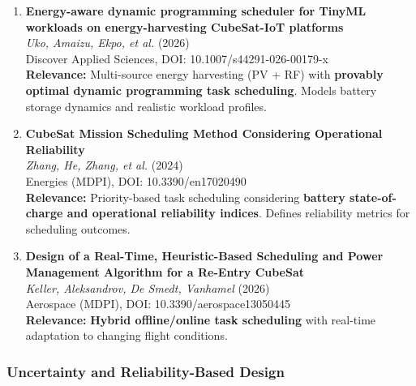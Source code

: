 \documentclass[11pt]{article}
\begin{document}
\begin{enumerate}[label=\textbf{\arabic*.},resume]
    \item \textbf{Energy-aware dynamic programming scheduler for TinyML workloads on energy-harvesting CubeSat-IoT platforms}\\
    \textit{Uko, Amaizu, Ekpo, et al.} (2026)\\
    Discover Applied Sciences, DOI: 10.1007/s44291-026-00179-x\\
    \textbf{Relevance:} Multi-source energy harvesting (PV + RF) with \textbf{provably optimal dynamic programming task scheduling}. Models battery storage dynamics and realistic workload profiles.

    \item \textbf{CubeSat Mission Scheduling Method Considering Operational Reliability}\\
    \textit{Zhang, He, Zhang, et al.} (2024)\\
    Energies (MDPI), DOI: 10.3390/en17020490\\
    \textbf{Relevance:} Priority-based task scheduling considering \textbf{battery state-of-charge and operational reliability indices}. Defines reliability metrics for scheduling outcomes.

    \item \textbf{Design of a Real-Time, Heuristic-Based Scheduling and Power Management Algorithm for a Re-Entry CubeSat}\\
    \textit{Keller, Aleksandrov, De Smedt, Vanhamel} (2026)\\
    Aerospace (MDPI), DOI: 10.3390/aerospace13050445\\
    \textbf{Relevance:} \textbf{Hybrid offline/online task scheduling} with real-time adaptation to changing flight conditions.
\end{enumerate}

\subsubsection{Uncertainty and Reliability-Based Design}
\end{document}
